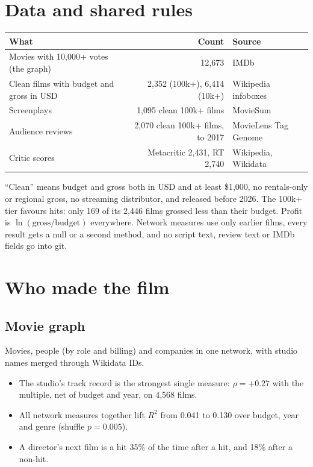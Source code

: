\documentclass[10pt]{article}
\begin{document}

\section{Data and shared rules}

\begin{tabularx}{\linewidth}{@{}p{5.4cm}rL@{}}
\toprule
What & Count & Source \\
\midrule
Movies with 10,000+ votes (the graph) & 12,673 & IMDb \\
Clean films with budget and gross in USD & 2,352 (100k+), 6,414 (10k+) & Wikipedia infoboxes \\
Screenplays & 1,095 clean 100k+ films & MovieSum \\
Audience reviews & 2,070 clean 100k+ films, to 2017 & MovieLens Tag Genome \\
Critic scores & Metacritic 2,431, RT 2,740 & Wikipedia, Wikidata \\
\bottomrule
\end{tabularx}

\smallskip
``Clean'' means budget and gross both in USD and at least \$1,000, no rentals-only or regional gross, no streaming
distributor, and released before 2026. The 100k+ tier favours hits: only 169 of its 2,446 films grossed less than their
budget. Profit is $\ln(\text{gross}/\text{budget})$ everywhere. Network measures use only earlier films, every result
gets a null or a second method, and no script text, review text or IMDb fields go into git.

\section{Who made the film}

\subsection{Movie graph }
Movies, people (by role and billing) and companies in one network, with studio names merged through Wikidata IDs.
\begin{itemize}
  \item The studio's track record is the strongest single measure: $\rho = +0.27$ with the multiple, net of budget and year, on 4,568 films.
  \item All network measures together lift $R^2$ from 0.041 to 0.130 over budget, year and genre (shuffle $p = 0.005$).
  \item A director's next film is a hit 35\% of the time after a hit, and 18\% after a non-hit.
\end{itemize}
\end{document}
